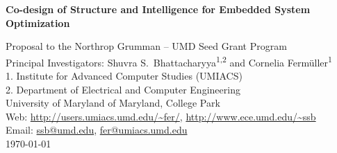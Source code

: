 \documentclass[12pt]{article}
\begin{document}
% 

\begin{center}
\begin{spacing}{1.8}
{\Large\textbf{Co-design of Structure and Intelligence
for Embedded System Optimization}}\par
\end{spacing}
\vspace{.06in}
{\sc  Proposal to the Northrop Grumman -- UMD Seed Grant Program}\\
\vspace{.06in}
Principal Investigators: Shuvra S.\ Bhattacharyya\textsuperscript{1,2} and 
Cornelia Ferm\"{u}ller\textsuperscript{1}\\
\vspace{0.06in}
1. Institute for Advanced Computer Studies (UMIACS)\\
2. Department of Electrical and Computer Engineering\\
\vspace{0.06in}
University of Maryland  of Maryland, College Park\\ 
Web: 
\url{http://users.umiacs.umd.edu/~fer/}, \url{http://www.ece.umd.edu/~ssb}\\
Email: \url{ssb@umd.edu}, \url{fer@umiacs.umd.edu}\\
\vspace{0.06in}
\today
\end{center}
\end{document}
